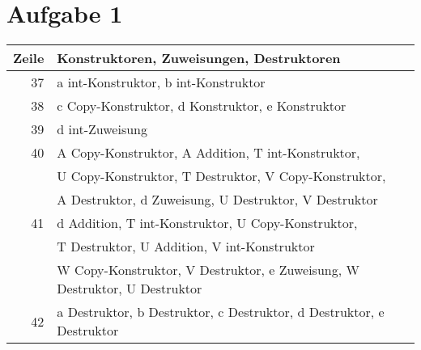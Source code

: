 \documentclass{article}
\begin{document}
    \section*{Aufgabe 1}
    \begin{tabular}{r|l}
        Zeile&Konstruktoren, Zuweisungen, Destruktoren\\
        \hline
        37 & a int-Konstruktor, b int-Konstruktor\\
        38 & c Copy-Konstruktor, d Konstruktor, e Konstruktor\\
        39 & d int-Zuweisung\\
        40 & A Copy-Konstruktor, A Addition, T int-Konstruktor,\\ 
        &U Copy-Konstruktor, T Destruktor, V Copy-Konstruktor,\\
        &A Destruktor, d Zuweisung, U Destruktor, V Destruktor\\
        41 & d Addition, T int-Konstruktor, U Copy-Konstruktor, \\
        &T Destruktor, U Addition, V int-Konstruktor\\
        & W Copy-Konstruktor, V Destruktor, e Zuweisung, W Destruktor, U Destruktor\\
        42 & a Destruktor, b Destruktor, c Destruktor, d Destruktor, e Destruktor\\
    \end{tabular} 
    
\end{document}
